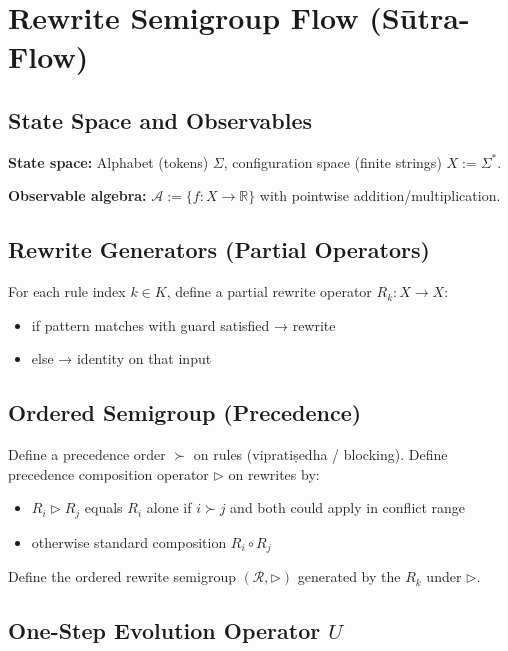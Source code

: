 \documentclass[12pt, oneside]{article}
\begin{document}
\section{Rewrite Semigroup Flow (Sūtra-Flow)}

\subsection{State Space and Observables}

\textbf{State space:} Alphabet (tokens) $\Sigma$, configuration space (finite strings) $X := \Sigma^*$.

\textbf{Observable algebra:} $\mathcal{A} := \{ f: X \rightarrow \mathbb{R} \}$ with pointwise addition/multiplication.

\subsection{Rewrite Generators (Partial Operators)}

For each rule index $k \in K$, define a partial rewrite operator $R_k: X \rightarrow X$:
\begin{itemize}
    \item if pattern matches with guard satisfied → rewrite
    \item else → identity on that input
\end{itemize}

\subsection{Ordered Semigroup (Precedence)}

Define a precedence order $\succ$ on rules (vipratiṣedha / blocking). Define precedence composition operator $\triangleright$ on rewrites by:
\begin{itemize}
    \item $R_i \triangleright R_j$ equals $R_i$ alone if $i \succ j$ and both could apply in conflict range
    \item otherwise standard composition $R_i \circ R_j$
\end{itemize}
Define the ordered rewrite semigroup $(\mathcal{R}, \triangleright)$ generated by the $R_k$ under $\triangleright$.

\subsection{One-Step Evolution Operator $U$}
\end{document}

